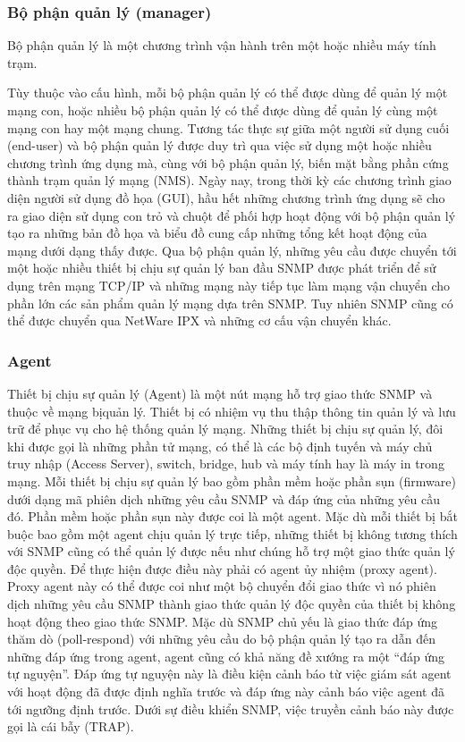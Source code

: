 \documentclass[12pt,oneside,a4paper,reqno]{report}
\begin{document}
\begin{large}
\subsubsection{Bộ phận quản lý (manager)} 

Bộ phận quản lý là một chương trình vận hành trên một hoặc nhiều máy tính trạm. 

Tùy thuộc vào cấu hình, mỗi bộ phận quản lý có thể được dùng để quản lý một mạng con, hoặc nhiều bộ phận quản lý có thể được dùng để quản lý cùng một mạng con hay một mạng chung. Tương tác thực sự giữa một người sử dụng cuối (end-user) và bộ phận quản lý được duy trì qua việc sử dụng một hoặc nhiều chương trình ứng dụng mà, cùng với bộ phận quản lý, biến mặt bằng phần cứng thành trạm quản lý mạng (NMS). Ngày nay, trong thời kỳ các chương trình giao diện người sử dụng đồ họa (GUI), hầu hết những chương trình ứng dụng sẽ cho ra giao diện sử dụng con trỏ và chuột để phối hợp hoạt động với bộ phận quản lý tạo ra những bản đồ họa và biểu đồ cung cấp những tổng kết hoạt động của mạng dưới dạng thấy được. Qua bộ phận quản lý, những yêu cầu được chuyển tới một hoặc nhiều thiết bị chịu sự quản lý ban đầu SNMP được phát triển để sử dụng trên mạng TCP/IP và những mạng này tiếp tục làm mạng vận chuyển cho phần lớn các sản phẩm quản lý mạng dựa trên SNMP. Tuy nhiên SNMP cũng có thể được chuyển qua NetWare IPX và những cơ cấu vận chuyển khác.

\subsubsection{Agent}

Thiết bị chịu sự quản lý (Agent) là một nút mạng hỗ trợ giao thức SNMP và thuộc về mạng bịquản lý. Thiết bị có nhiệm vụ thu thập thông tin quản lý và lưu trữ để phục vụ cho hệ thống quản lý mạng. Những thiết bị chịu sự quản lý, đôi khi được gọi là những phần tử mạng, có thể là các bộ định tuyến và máy chủ truy nhập (Access Server), switch, bridge, hub và máy tính hay là máy in trong mạng. Mỗi thiết bị chịu sự quản lý bao gồm phần mềm hoặc phần sụn (firmware) dưới dạng mã phiên dịch những yêu cầu SNMP và đáp ứng của những yêu cầu đó. Phần mềm hoặc phần sụn này được coi là một agent. Mặc dù mỗi thiết bị bắt buộc bao gồm một agent chịu quản lý trực tiếp, những thiết bị không tương thích với SNMP cũng có thể quản lý được nếu như chúng hỗ trợ một giao thức quản lý độc quyền. Để thực hiện được điều này phải có agent ủy nhiệm (proxy agent). Proxy agent này có thể được coi như một bộ chuyển đổi giao thức vì nó phiên dịch những yêu cầu SNMP thành giao thức quản lý độc quyền của thiết bị không hoạt động theo giao thức SNMP. Mặc dù SNMP chủ yếu là giao thức đáp ứng thăm dò (poll-respond) với những yêu cầu do bộ phận quản lý tạo ra dẫn đến những đáp ứng trong agent, agent cũng có khả năng đề xướng ra một “đáp ứng tự nguyện”. Đáp ứng tự nguyện này là điều kiện cảnh báo từ việc giám sát agent với hoạt động đã được định nghĩa trước và đáp ứng này cảnh báo việc agent đã tới ngưỡng định trước. Dưới sự điều khiển SNMP, việc truyền cảnh báo này được gọi là cái bẫy (TRAP).


\end{large}
\end{document}
